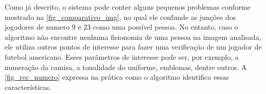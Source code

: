 Como já descrito, o sistema pode conter alguns pequenos problemas conforme mostrado na \autoref{fig_comparativo_img}, no qual ele confunde as junções dos jogadores de numero 9 e 23 como uma possível pessoa. No entanto, caso o algoritmo não encontre nenhuma fisionomia de uma pessoa na imagem analisada, ele utiliza outros pontos de interesse para fazer uma verificação de um jogador de futebol americano. Esses parâmetros de interesse pode ser, por exemplo, a numeração da camisa, a tonalidade do uniforme, emblemas, dentre outros. A \autoref{fig_rec_numero} expressa na prática como o algoritmo identifica essas características.